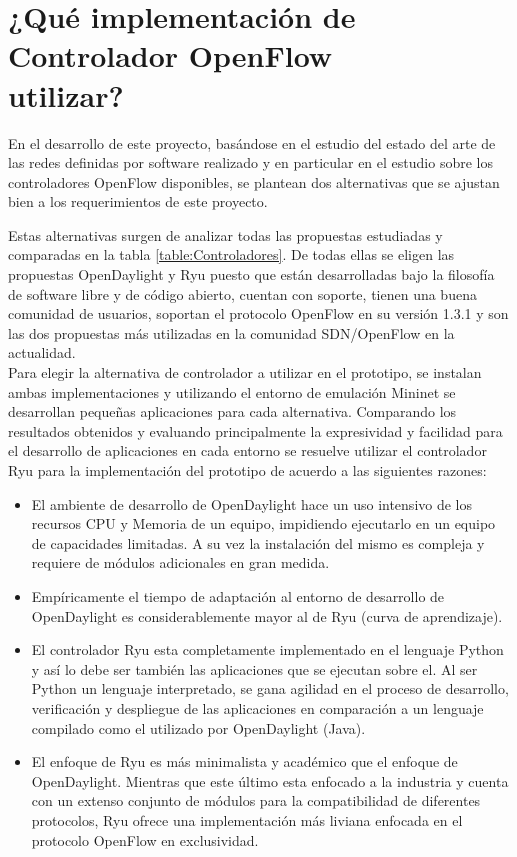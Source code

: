 \section[¿Qu\'e implementaci\'on de Controlador OpenFlow utilizar?]{¿Qu\'e implementaci\'on de Controlador OpenFlow \\ utilizar?}
En el desarrollo de este proyecto, basándose en el estudio del estado del arte de las redes definidas por software realizado y en particular en el estudio sobre los controladores OpenFlow disponibles, se plantean dos alternativas que se ajustan bien a los requerimientos de este proyecto.

Estas alternativas surgen de analizar todas las propuestas estudiadas y comparadas en la tabla \ref{table:Controladores}. De todas ellas se eligen las propuestas OpenDaylight y Ryu puesto que est\'an desarrolladas bajo la filosofía de software libre y de código abierto, cuentan con soporte, tienen una buena comunidad de usuarios, soportan el protocolo OpenFlow en su versi\'on 1.3.1 y son las dos propuestas m\'as utilizadas en la comunidad SDN/OpenFlow en la actualidad.\\

Para elegir la alternativa de controlador a utilizar en el prototipo, se instalan ambas implementaciones y utilizando el entorno de emulación Mininet se desarrollan pequeñas aplicaciones para cada alternativa. Comparando los resultados obtenidos y evaluando principalmente la expresividad y facilidad para el desarrollo de aplicaciones en cada entorno se resuelve utilizar el controlador Ryu para la implementaci\'on del prototipo de acuerdo a las siguientes razones:

\begin{itemize}
\item El ambiente de desarrollo de OpenDaylight hace un uso intensivo de los recursos CPU y Memoria de un equipo, impidiendo ejecutarlo en un equipo de capacidades limitadas. A su vez la instalaci\'on del mismo es compleja y requiere de m\'odulos adicionales en gran medida.

\item Empíricamente el tiempo de adaptaci\'on al entorno de desarrollo de OpenDaylight es considerablemente mayor al de Ryu (curva de aprendizaje).  

\item El controlador Ryu esta completamente implementado en el lenguaje Python y as\'i lo debe ser también las aplicaciones que se ejecutan sobre el. Al ser Python un lenguaje interpretado, se gana agilidad en el proceso de desarrollo, verificaci\'on y despliegue de las aplicaciones en comparaci\'on a un lenguaje compilado como el utilizado por OpenDaylight (Java).

\item El enfoque de Ryu es m\'as minimalista y académico que el enfoque de OpenDaylight. Mientras que este \'ultimo esta enfocado a la industria y cuenta con un extenso conjunto de módulos para la compatibilidad de diferentes protocolos, Ryu ofrece una implementaci\'on m\'as liviana enfocada en el protocolo OpenFlow en exclusividad. 
\end{itemize}  

